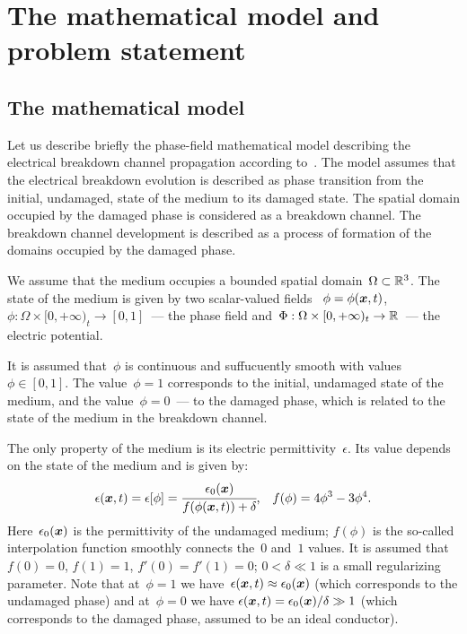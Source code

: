 
\section{The mathematical model and problem statement}
\label{sec:problem_and_model}

\subsection{The mathematical model}
Let us describe briefly the phase-field mathematical model describing
the electrical breakdown channel propagation
according to~\cite{pitike_dielectric_breakdown}.
The model assumes that the electrical breakdown evolution
is described as phase transition from the initial, undamaged, state of
the medium to its damaged state. The spatial domain occupied by the
damaged phase is considered as a breakdown channel.
The breakdown channel development is described as a process of
formation of the domains occupied by the damaged phase.

We assume that the medium occupies a bounded spatial domain~$\Omega \subset
{\mathbb{R}}^3$. The state of the medium is given by two scalar-valued fields~
$\phi = \phi({\boldsymbol{x}},t)$, $\phi: \Omega \times [0, +\infty)_t \to [0,
1]$~--- the phase field
and~$\Phi: \Omega \times [0, +\infty)_t \to {\mathbb{R}}$~--- the electric potential.

It is assumed that~$\phi$ is continuous and suffucuently smooth
with values~$\phi\in[0,1]$. The value~$\phi=1$
corresponds to the initial, undamaged state of the medium,
and the value~$\phi=0$~--- to the damaged phase, which is
related to the state of the medium in the breakdown channel.

The only property of the medium is its electric permittivity~$\epsilon$.
Its value depends on the state of the medium and is
given by:
%
\begin{equation}
  \epsilon({\boldsymbol{x}}, t) = \epsilon[\phi] = \cfrac{\epsilon_0({\boldsymbol{x}})}{f(\phi({\boldsymbol{x}}, t)) + \delta} {\text{,}} \quad f(\phi) = 4\phi^3 - 3\phi^4 {\text{.}}
  \label{eq:epsilon}
\end{equation}
Here~$\epsilon_0({\boldsymbol{x}})$ is the permittivity of the undamaged medium;
$f(\phi)$ is the so-called interpolation function smoothly connects
the~$0$ and~$1$ values. It is assumed
that~$f(0) = 0$, $f(1) = 1$, $f'(0) = f'(1) = 0$;
$0 < \delta \ll 1$ is a small regularizing parameter.
Note that at~$\phi = 1$ we have~$\epsilon({\boldsymbol{x}}, t) \approx
\epsilon_0({\boldsymbol{x}})$ (which corresponds to the undamaged phase)
and at~$\phi = 0$ we have $\epsilon({\boldsymbol{x}}, t) = \epsilon_0({\boldsymbol{x}}) /\delta \gg 1$
(which corresponds to the damaged phase, assumed to be an ideal conductor).

